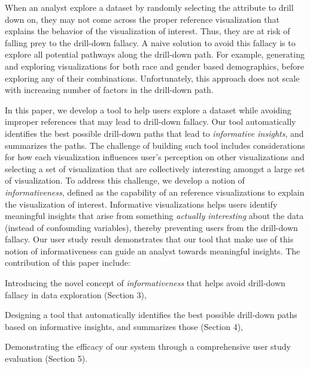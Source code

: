 
When an analyst explore a dataset by randomly selecting the attribute to drill down on, they may not come across the proper reference visualization that explains the behavior of the visualization of interest. Thus, they are at risk of falling prey to the drill-down fallacy. A naive solution to avoid this fallacy is to explore all potential pathways along the drill-down path. For example, generating and exploring visualizations for both race and gender based demographics, before exploring any of their combinations. Unfortunately, this approach does not scale with increasing number of factors in the drill-down path.

In this paper, we develop a tool to help users explore a dataset while avoiding improper references that may lead to drill-down fallacy. Our tool automatically identifies the best possible drill-down paths that lead to \emph{informative insights}, and summarizes the paths. The challenge of building such tool includes considerations for how each visualization influences user's perception on other visualizations and selecting a set of visualization that are collectively interesting amongst a large set of visualization. To address this challenge, we develop a notion of \emph{informativeness}, defined as the capability of an reference visualizations to explain the visualization of interest. Informative visualizations helps users identify meaningful insights that arise from something \textit{actually interesting} about the data (instead of confounding variables), thereby preventing users from the drill-down fallacy. Our user study result demonstrates that our tool that make use of this notion of informativeness can guide an analyst towards meaningful insights. The contribution of this paper include:
\begin{denselist}
\item Introducing the novel concept of \emph{informativeness} that helps avoid drill-down fallacy in data exploration (Section 3),
\item Designing a tool that automatically identifies the best possible drill-down paths based on informative insights, and summarizes those (Section 4),
\item Demonstrating the efficacy of our system through a comprehensive user study evaluation (Section 5).
\end{denselist}

